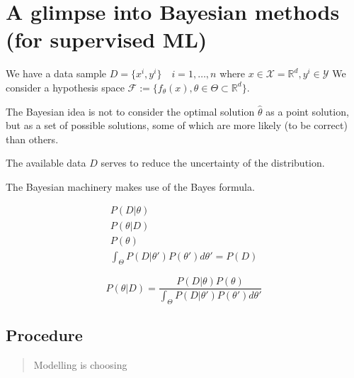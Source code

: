 \section{A glimpse into Bayesian methods (for supervised ML)}

We have a data sample \(D = \{ x^i, y^i\}\quad i = 1, \dots, n\)
where \(x \in \mathcal{X} = \mathds{R}^d, y^i \in \mathcal{Y}\)
We consider a hypothesis space
\(\mathcal{F} := \{ f_\theta (x), \theta \in \Theta \subset \mathds{R}^d \}\).

The Bayesian idea is not to consider the optimal solution
\(\hat{\theta}\) as a point solution, but as a set of possible solutions,
some of which are more likely (to be correct) than others.

The available data \(D\) serves to reduce the uncertainty of the
distribution.

The Bayesian machinery makes use of the Bayes formula.

\begin{align*}
	P(D | \theta) \tag{likelihood} \\
	P(\theta | D) \tag{posterior}  \\
	P(\theta) \tag{prior}          \\
	\int_\Theta P(D | \theta') P(\theta') d\theta' = P(D) \tag{EXPECTED \equiv EVIDENCE}
\end{align*}

\[
	P(\theta | D) = \frac{P(D | \theta) P(\theta)}
	{ \int_\Theta P(D | \theta') P(\theta') d\theta' }
\]

\subsection{Procedure}

\begin{quote}
	Modelling is choosing
\end{quote}


